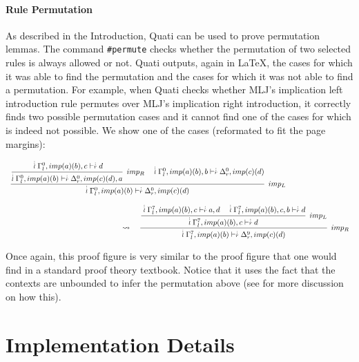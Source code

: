 \documentclass{llncs}
\newcommand{\ndots}[1]{\stackrel{\vcenter{\hbox{$\scriptstyle :$}\vskip-.35ex}}
   {\hbox {$ \scriptstyle {#1}$}}}
\begin{document}
\vspace{-2mm}

\paragraph{Rule Permutation}
As described in the Introduction, Quati can be used to prove permutation lemmas. The command \texttt{\#permute} 
checks whether the permutation of two selected rules is always allowed or not. Quati outputs, again in \LaTeX, the cases for
which it was able to find the permutation and the cases for which it was not able to find a permutation. For example, when Quati 
checks whether MLJ's implication left introduction rule permutes over MLJ's
implication right introduction, it correctly finds two possible
permutation cases and it cannot find one of the cases for which is indeed not possible. We show one of the cases (reformated to fit the page margins):
\vspace{-3mm}

{\scriptsize
\[
\begin{array}{ll}
\cfrac{\cfrac{ \ndots{l} \Gamma_{l}^{0}, imp (a) (b) , c \vdash  \ndots{r} d}
{ \ndots{l} \Gamma_{l}^{0}, imp (a) (b)  \vdash  \ndots{r} \Delta_{r}^{0}, imp (c) (d) , a} \;\; imp_{R}
\quad
 \ndots{l} \Gamma_{l}^{0}, imp (a) (b) , b \vdash  \ndots{r} \Delta_{r}^{0}, imp (c) (d) }
{ \ndots{l} \Gamma_{l}^{0}, imp (a) (b)  \vdash  \ndots{r} \Delta_{r}^{0}, imp (c) (d) } \;\; imp_{L}\\\\
\qquad \qquad \qquad \qquad \qquad \qquad \qquad \quad\rightsquigarrow\quad
\cfrac{\cfrac{ \ndots{l} \Gamma_{l}^{7}, imp (a) (b) , c \vdash  \ndots{r} a, d
\quad
 \ndots{l} \Gamma_{l}^{7}, imp (a) (b) , c, b \vdash  \ndots{r} d}
{ \ndots{l} \Gamma_{l}^{7}, imp (a) (b) , c \vdash  \ndots{r} d} \;\; imp_{L}}
{ \ndots{l} \Gamma_{l}^{7}, imp (a) (b)  \vdash  \ndots{r} \Delta_{r}^{9}, imp (c) (d) } \;\; imp_{R}
\end{array}
\]
}

Once again, this proof figure is very similar to the proof figure that one would find in a standard proof theory textbook.
Notice that it uses the fact that the contexts are unbounded to infer the permutation above (see \cite{nigam13iclp} for 
more discussion on how this).

\section{Implementation Details}
\label{sec:impl}
\end{document}
